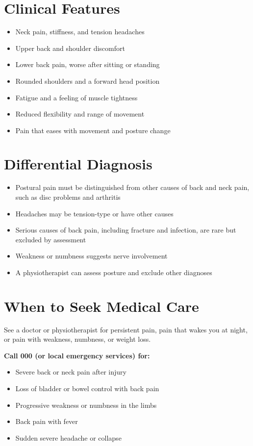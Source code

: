 \section*{Clinical Features}
\begin{itemize}
    \item Neck pain, stiffness, and tension headaches
    \item Upper back and shoulder discomfort
    \item Lower back pain, worse after sitting or standing
    \item Rounded shoulders and a forward head position
    \item Fatigue and a feeling of muscle tightness
    \item Reduced flexibility and range of movement
    \item Pain that eases with movement and posture change
\end{itemize}

\section*{Differential Diagnosis}
\begin{itemize}
    \item Postural pain must be distinguished from other causes of back and neck pain, such as disc problems and arthritis
    \item Headaches may be tension-type or have other causes
    \item Serious causes of back pain, including fracture and infection, are rare but excluded by assessment
    \item Weakness or numbness suggests nerve involvement
    \item A physiotherapist can assess posture and exclude other diagnoses
\end{itemize}

\section*{When to Seek Medical Care}
See a doctor or physiotherapist for persistent pain, pain that wakes you at night, or pain with weakness, numbness, or weight loss.

\textbf{Call 000 (or local emergency services) for:}
\begin{itemize}
    \item Severe back or neck pain after injury
    \item Loss of bladder or bowel control with back pain
    \item Progressive weakness or numbness in the limbs
    \item Back pain with fever
    \item Sudden severe headache or collapse
\end{itemize}

